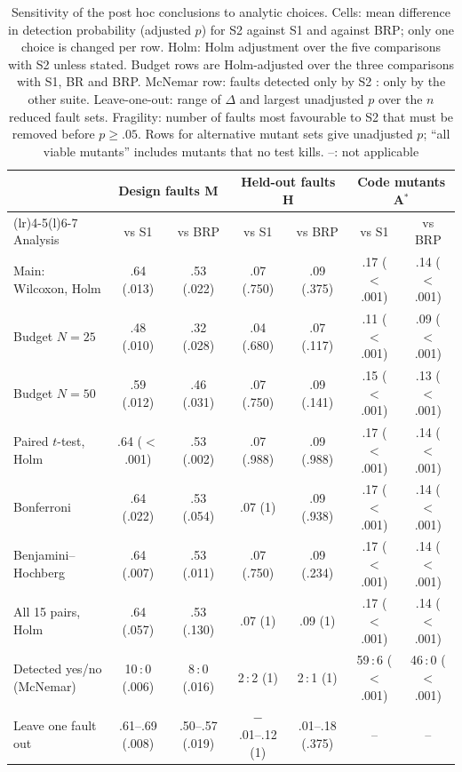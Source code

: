 \begin{table}[!t]
\caption{Sensitivity of the post hoc conclusions to analytic choices. Cells: mean difference in detection probability (adjusted $p$) for S2 against S1 and against BRP; only one choice is changed per row. Holm: Holm adjustment over the five comparisons with S2 unless stated. Budget rows are Holm-adjusted over the three comparisons with S1, BR and BRP. McNemar row: faults detected only by S2 : only by the other suite. Leave-one-out: range of $\Delta$ and largest unadjusted $p$ over the $n$ reduced fault sets. Fragility: number of faults most favourable to S2 that must be removed before $p\geq.05$. Rows for alternative mutant sets give unadjusted $p$; ``all viable mutants'' includes mutants that no test kills. --: not applicable}
\label{tab:sens}
\footnotesize
\setlength{\tabcolsep}{3pt}
\begin{tabular}{@{}>{\raggedright\arraybackslash}lcccccc@{}}
\toprule
 & \multicolumn{2}{c}{Design faults M} & \multicolumn{2}{c}{Held-out faults H} & \multicolumn{2}{c}{Code mutants A$^{*}$} \\
\cmidrule(lr){2-3}\cmidrule(lr){4-5}\cmidrule(l){6-7}
Analysis & vs S1 & vs BRP & vs S1 & vs BRP & vs S1 & vs BRP \\
\midrule
Main: Wilcoxon, Holm & .64 (.013) & .53 (.022) & .07 (.750) & .09 (.375) & .17 ($<$.001) & .14 ($<$.001) \\
Budget $N=25$ & .48 (.010) & .32 (.028) & .04 (.680) & .07 (.117) & .11 ($<$.001) & .09 ($<$.001) \\
Budget $N=50$ & .59 (.012) & .46 (.031) & .07 (.750) & .09 (.141) & .15 ($<$.001) & .13 ($<$.001) \\
Paired $t$-test, Holm & .64 ($<$.001) & .53 (.002) & .07 (.988) & .09 (.988) & .17 ($<$.001) & .14 ($<$.001) \\
Bonferroni & .64 (.022) & .53 (.054) & .07 (1) & .09 (.938) & .17 ($<$.001) & .14 ($<$.001) \\
Benjamini--Hochberg & .64 (.007) & .53 (.011) & .07 (.750) & .09 (.234) & .17 ($<$.001) & .14 ($<$.001) \\
All 15 pairs, Holm & .64 (.057) & .53 (.130) & .07 (1) & .09 (1) & .17 ($<$.001) & .14 ($<$.001) \\
Detected yes/no (McNemar) & 10\,:\,0 (.006) & 8\,:\,0 (.016) & 2\,:\,2 (1) & 2\,:\,1 (1) & 59\,:\,6 ($<$.001) & 46\,:\,0 ($<$.001) \\
Leave one fault out & .61--.69 (.008) & .50--.57 (.019) & $-$.01--.12 (1) & .01--.18 (.375) & -- & -- \\

\end{tabular}
\end{table}
